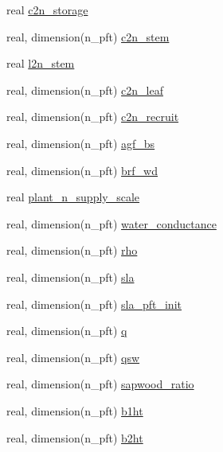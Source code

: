 \begin{DoxyCompactItemize}
\item 
real \hyperlink{namespacepft__coms_a2bdc4c753d41f0e863f3e00b13c8393f}{c2n\+\_\+storage}
\item 
real, dimension(n\+\_\+pft) \hyperlink{namespacepft__coms_a45821066c1cdf886389c40c7ddbefa7f}{c2n\+\_\+stem}
\item 
real \hyperlink{namespacepft__coms_aadbb3423514f8f93b48b2a626d4b000d}{l2n\+\_\+stem}
\item 
real, dimension(n\+\_\+pft) \hyperlink{namespacepft__coms_a62386599b26b4cf8d478b513f813d974}{c2n\+\_\+leaf}
\item 
real, dimension(n\+\_\+pft) \hyperlink{namespacepft__coms_ad105c123dc17ca1fb99476b476e035a4}{c2n\+\_\+recruit}
\item 
real, dimension(n\+\_\+pft) \hyperlink{namespacepft__coms_a9d509e7c71beaa9054f49d583f01f433}{agf\+\_\+bs}
\item 
real, dimension(n\+\_\+pft) \hyperlink{namespacepft__coms_aad5b7cd93696f04e149139562ce0f7be}{brf\+\_\+wd}
\item 
real \hyperlink{namespacepft__coms_a519f5d42172d290ddad951a2744c5a20}{plant\+\_\+n\+\_\+supply\+\_\+scale}
\item 
real, dimension(n\+\_\+pft) \hyperlink{namespacepft__coms_a57b4aabb4896e59800ec2159c64d06b3}{water\+\_\+conductance}
\item 
real, dimension(n\+\_\+pft) \hyperlink{namespacepft__coms_aec4095886699dcf26ce469d85c675ed5}{rho}
\item 
real, dimension(n\+\_\+pft) \hyperlink{namespacepft__coms_ad1aabb01620d2b7320709e93cfe784f8}{sla}
\item 
real, dimension(n\+\_\+pft) \hyperlink{namespacepft__coms_a535eacb23669b894d3f37596a40673e2}{sla\+\_\+pft\+\_\+init}
\item 
real, dimension(n\+\_\+pft) \hyperlink{namespacepft__coms_a94feb354a8416167ef0ff2690843ebcd}{q}
\item 
real, dimension(n\+\_\+pft) \hyperlink{namespacepft__coms_a646ad26118949294d5b8007435e7d33d}{qsw}
\item 
real, dimension(n\+\_\+pft) \hyperlink{namespacepft__coms_ad00617b976d68174e6d5fb6227be9d90}{sapwood\+\_\+ratio}
\item 
real, dimension(n\+\_\+pft) \hyperlink{namespacepft__coms_a00f748893c4f7254524515d560a16eee}{b1ht}
\item 
real, dimension(n\+\_\+pft) \hyperlink{namespacepft__coms_a5c7b374e94930d3266444e1ef0539447}{b2ht}
\item 

\end{DoxyCompactItemize}
